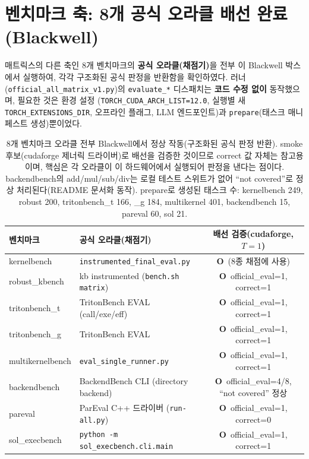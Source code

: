 \documentclass[11pt]{article}
\newcommand{\yes}{\textcolor{green!55!black}{\textbf{O}}}
\newcommand{\code}[1]{\texttt{\small #1}}
\begin{document}
\section{벤치마크 축: 8개 공식 오라클 배선 완료 (Blackwell)}
매트릭스의 다른 축인 8개 벤치마크의 \textbf{공식 오라클(채점기)}을 전부 이 Blackwell 박스에서 실행하여,
각각 구조화된 공식 판정을 반환함을 확인하였다. 러너(\code{official\_all\_matrix\_v1.py})의
\code{evaluate\_*} 디스패치는 \textbf{코드 수정 없이} 동작했으며, 필요한 것은 환경 설정
(\code{TORCH\_CUDA\_ARCH\_LIST=12.0}, 실행별 새 \code{TORCH\_EXTENSIONS\_DIR}, 오프라인 플래그,
LLM 엔드포인트)과 \code{prepare}(태스크 매니페스트 생성)뿐이었다.

\begin{table}[h]
\centering
\begin{tabular}{@{}llc@{}}
\toprule
\textbf{벤치마크} & \textbf{공식 오라클(채점기)} & \textbf{배선 검증(cudaforge, $T{=}1$)} \\
\midrule
kernelbench      & \code{instrumented\_final\_eval.py}         & \yes\ (8종 채점에 사용) \\
robust\_kbench   & kb instrumented (\code{bench.sh matrix})   & \yes\ official\_eval=1, correct=1 \\
tritonbench\_t   & TritonBench EVAL (call/exe/eff)            & \yes\ official\_eval=1, correct=1 \\
tritonbench\_g   & TritonBench EVAL                           & \yes\ official\_eval=1, correct=1 \\
multikernelbench & \code{eval\_single\_runner.py}              & \yes\ official\_eval=1, correct=1 \\
backendbench     & BackendBench CLI (directory backend)      & \yes\ official\_eval=4/8, ``not covered'' 정상 \\
pareval          & ParEval C++ 드라이버 (\code{run-all.py})    & \yes\ official\_eval=1, correct=0 \\
sol\_execbench   & \code{python -m sol\_execbench.cli.main}    & \yes\ official\_eval=1, correct=1 \\
\bottomrule
\end{tabular}
\caption{8개 벤치마크 오라클 전부 Blackwell에서 정상 작동(구조화된 공식 판정 반환).
smoke 후보(cudaforge 제너릭 드라이버)로 배선을 검증한 것이므로 correct 값 자체는 참고용이며,
핵심은 각 오라클이 이 하드웨어에서 실행되어 판정을 낸다는 점이다. backendbench의 add/mul/sub/div는
로컬 테스트 스위트가 없어 ``not covered''로 정상 처리된다(README 문서화 동작).
prepare로 생성된 태스크 수: kernelbench 249, robust 200, tritonbench\_t 166, \_g 184,
multikernel 401, backendbench 15, pareval 60, sol 21.}
\end{table}
\end{document}
